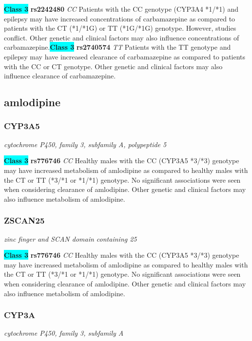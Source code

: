 \documentclass{report}
\begin{document}
\textbf{\colorbox{cyan} {Class 3}} \textbf{ rs2242480 } \textit{ CC }
Patients with the CC genotype (CYP3A4 *1/*1) and epilepsy may have increased concentrations of carbamazepine as compared to patients with the CT (*1/*1G) or TT (*1G/*1G) genotype. However, studies conflict. Other genetic and clinical factors may also influence concentrations of carbamazepine.\newline\textbf{\colorbox{cyan} {Class 3}} \textbf{ rs2740574 } \textit{ TT }
Patients with the TT genotype and epilepsy may have increased clearance of carbamazepine as compared to patients with the CC or CT genotype. Other genetic and clinical factors may also influence clearance of carbamazepine.\newline\subsection{ amlodipine }\subsubsection{ CYP3A5 }
\textit{ cytochrome P450, family 3, subfamily A, polypeptide 5 }

\textbf{\colorbox{cyan} {Class 3}} \textbf{ rs776746 } \textit{ CC }
Healthy males with the CC (CYP3A5 *3/*3) genotype may have increased metabolism of amlodipine as compared to healthy males with the CT or TT (*3/*1 or *1/*1) genotype. No significant associations were seen when considering clearance of amlodipine. Other genetic and clinical factors may also influence metabolism of amlodipine.\newline\subsubsection{ ZSCAN25 }
\textit{ zinc finger and SCAN domain containing 25 }

\textbf{\colorbox{cyan} {Class 3}} \textbf{ rs776746 } \textit{ CC }
Healthy males with the CC (CYP3A5 *3/*3) genotype may have increased metabolism of amlodipine as compared to healthy males with the CT or TT (*3/*1 or *1/*1) genotype. No significant associations were seen when considering clearance of amlodipine. Other genetic and clinical factors may also influence metabolism of amlodipine.\newline\subsubsection{ CYP3A }
\textit{ cytochrome P450, family 3, subfamily A }
\end{document}
